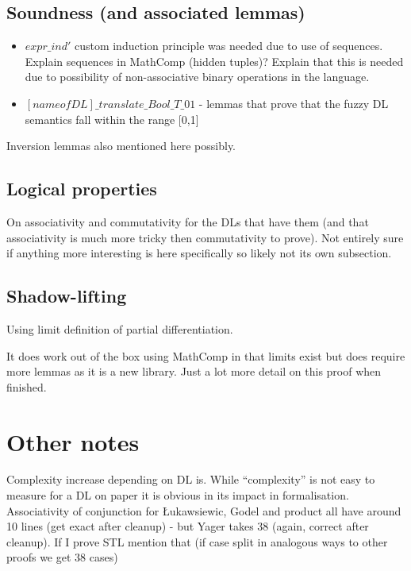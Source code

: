 \documentclass[a4paper,UKenglish,cleveref, autoref, thm-restate]{lipics-v2021}
\begin{document}
\subsection{Soundness (and associated lemmas)}

\begin{itemize}
	\item $expr\_ind'$ custom induction principle was needed due to use of sequences. Explain sequences in MathComp (hidden tuples)? Explain that this is needed due to possibility of non-associative binary operations in the language.
	\item $[name of DL]\_translate\_Bool\_T\_01$ - lemmas that prove that the fuzzy DL semantics fall within the range [0,1]
\end{itemize}

Inversion lemmas also mentioned here possibly.

\subsection{Logical properties}

On associativity and commutativity for the DLs that have them (and that associativity is much more tricky then commutativity to prove). Not entirely sure if anything more interesting is here specifically so likely not its own subsection.

\subsection{Shadow-lifting}

Using limit definition of partial differentiation.

It does work out of the box using MathComp in that limits exist but does require more lemmas as it is a new library.
Just a lot more detail on this proof when finished.


\section{Other notes}

Complexity increase depending on DL is. While ``complexity'' is not easy to measure for a DL on paper it is obvious in its impact in formalisation. Associativity of conjunction for Łukawsiewic, Godel and product all have around 10 lines (get exact after cleanup) - but Yager takes 38 (again, correct after cleanup). If I prove STL mention that (if case split in analogous ways to other proofs we get 38 cases)
\end{document}
